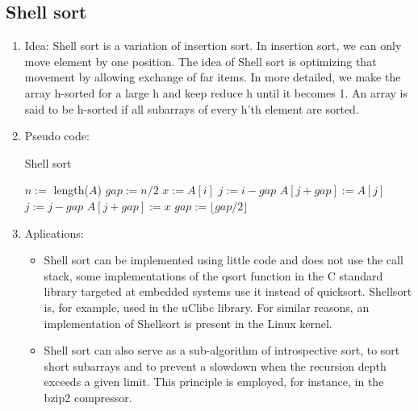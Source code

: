\documentclass[12pt]{article}
\begin{document}
    \subsection{Shell sort}
    \begin{enumerate}
        \item Idea: Shell sort is a variation of insertion sort. In insertion sort, we can only move element by one position. The idea of Shell sort is optimizing that movement by allowing exchange of far items. In more detailed, we make the array h-sorted for a large h and keep reduce h until it becomes 1. An array is said to be h-sorted if all subarrays of every h’th element are sorted.
        \item Pseudo code:
        \begin{algorithm}[H]
            \caption{Shell sort}
            \begin{algorithmic}[1]
                    \State $n:=$ length($A$)
                    \State $\textit{gap}:=n/2$
                            \State $x:=A[i]$
                            \State $j:=i-\textit{gap}$
                            \State $A[j+\textit{gap}]:=A[j]$
                            \State $j:=j-\textit{gap}$
                            \EndWhile
                            \State $A[j+\textit{gap}]:=x$
                        \EndFor
                        \State $\textit{gap}:=\lfloor \textit{gap}/2\rfloor$
                    \EndWhile
                \EndFunction
            \end{algorithmic}
        \end{algorithm}
        \item Aplications:
        \begin{itemize}
            \item Shell sort can be implemented using little code and does not use the call stack, some implementations of the qsort function in the C standard library targeted at embedded systems use it instead of quicksort. Shellsort is, for example, used in the uClibc library. For similar reasons, an implementation of Shellsort is present in the Linux kernel.
            \item Shell sort can also serve as a sub-algorithm of introspective sort, to sort short subarrays and to prevent a slowdown when the recursion depth exceeds a given limit. This principle is employed, for instance, in the bzip2 compressor.

\end{itemize}
\end{enumerate}
\end{document}
